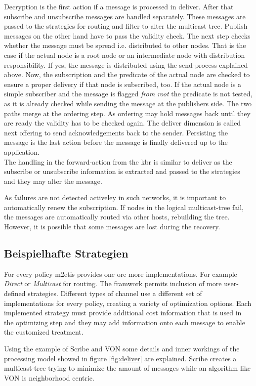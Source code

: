 Decryption is the first action if a message is processed in deliver. After that subscribe and unsubscribe messages are handled separately. These messages are passed to the strategies for routing and filter to alter the multicast tree. Publish messages on the other hand have to pass the validity check. The next step checks whether the message must be spread i.e. distributed to other nodes. That is the case if the actual node is a root node or an intermediate node with distribution responsibility. If yes, the message is distributed using the send-process explained above. Now, the subscription and the predicate of the actual node are checked to ensure a proper delivery if that node is subscribed, too. If the actual node is a simple subscriber and the message is flagged \emph{from root} the predicate is not tested, as it is already checked while sending the message at the publishers side. The two paths merge at the ordering step. As ordering may hold messages back until they are ready the validity has to be checked again. The deliver dimension is called next offering to send acknowledgements back to the sender. Persisting the message is the last action before the message is finally delivered up to the application.\\
The handling in the forward-action from the \ac{kbr} is similar to deliver as the subscribe or unsubscribe information is extracted and passed to the strategies and they may alter the message.

As failures are not detected activeley in such networks, it is important to automatically renew the subscription. If nodes in the logical multicast-tree fail, the messages are automatically routed via other hosts, rebuilding the tree. However, it is possible that some messages are lost during the recovery.

\subsection{Beispielhafte Strategien}
For every policy \ac{m2etis} provides one ore more implementations. For example \emph{Direct} or \emph{Multicast} for routing. The framwork permits inclusion of more user-defined strategies. Different types of channel use a different set of implementations for every policy, creating a variety of optimization options. Each implemented strategy must provide additional cost information that is used in the optimizing step and they may add information onto each message to enable the customized treatment.

Using the example of Scribe \cite{Castro2002Scribe} and VON \cite{Hu2006VON} some details and inner workings of the processing model showed in figure \ref{fig:deliver} are explained. Scribe creates a multicast-tree trying to minimize the amount of messages while an algorithm like VON is neighborhood centric.

